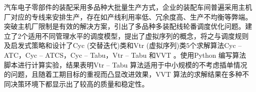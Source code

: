 ﻿%
汽车电子零部件的装配采用多品种大批量生产方式，企业的装配车间普遍采用主机厂对应的专线来安排生产，存在如产线利用率低、冗余度高、生产不均衡等弊端。突破主机厂限制是有效的解决方案，引出了多品种多装配线轮番调度优化问题。建立了$2$个适用不同管理水平的调度模型，提出了虚拟序列的概念，将之与调度规则及启发式策略和设计了Cyc (交替迭代)类和Vtr (虚拟序列)类$5$个求解算法Cyc -- ATC，Cyc -- ATCS，Cyc -- Tabu，Vtr -- Tabu 和VVT 。使用Python 编写算法脚本进行计算实验，结果表明Vtr -- Tabu 算法适用于中小规模的不考虑插单情况的问题，且随着工期目标的重视而凸显改进效果，VVT 算法的求解结果在多种不同决策环境下都显示出了较高的质量和稳定性。

